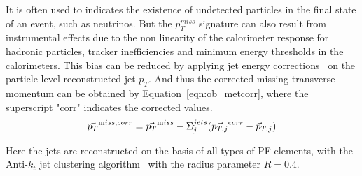 It is often used to indicates the existence of undetected particles in the final state of an event, such as neutrinos. But the $p_T ^{miss}$ signature can also result from instrumental effects due to the non linearity of the calorimeter response for hadronic particles, tracker inefficiencies and minimum energy thresholds in the calorimeters. This bias can be reduced by applying jet energy corrections~\cite{ob_jetcorr} on the particle-level reconstructed jet $p_T$. And thus the corrected missing transverse momentum can be obtained by Equation~\ref{eqn:ob_metcorr}, where the superscript "corr" indicates the corrected values.
\begin{equation}
\vec{p_T}^{\text miss,corr} = \vec{p_T} ^{\text miss} - \Sigma_{j}^{jets} (\vec{p_{T,j}} ^{\text corr} - \vec{p}_{T,j} )
\label{eqn:ob_metcorr}
\end{equation}

Here the jets are reconstructed on the basis of all types of PF elements, with the Anti-$k_t$ jet clustering algorithm~\cite{ob_jetantikt} with the radius parameter $R=0.4$.

